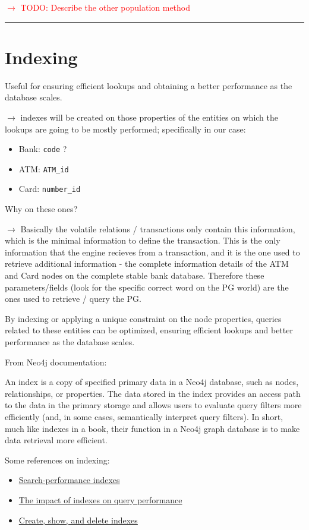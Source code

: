 \documentclass{article}
\begin{document}
\textcolor{red}{$\rightarrow$ TODO: Describe the other population method}

\textcolor{green}{\rule{\linewidth}{0.4mm}}


\section{Indexing}

Useful for ensuring efficient lookups and obtaining a better performance as the database 
scales.

$\rightarrow$ indexes will be created on those properties of the entities on which the 
lookups are going to be mostly performed; specifically in our case:
\begin{itemize}
  \item Bank: \texttt{code} ?
  \item ATM: \texttt{ATM\_id}
  \item Card: \texttt{number\_id}
\end{itemize}

Why on these ones?

$\rightarrow$ Basically the volatile relations / transactions only contain this information,
which is the minimal information to define the transaction. This is the only information that
the engine recieves from a transaction, and it is the one used to retrieve additional information - the complete information details of the ATM and Card nodes on the complete
stable bank database. Therefore these parameters/fields (look for the specific correct
word on the PG world) are the ones used to retrieve / query the PG. 

By indexing or applying a unique constraint on the node properties, queries related to these entities can be optimized, ensuring efficient lookups and better performance as the database scales.

From Neo4j documentation:
\begin{tcolorbox}
  An index is a copy of specified primary data in a Neo4j database, such as nodes, relationships, or properties. The data stored in the index provides an access path to the data in the primary storage and allows users to evaluate query filters more efficiently (and, in some cases, semantically interpret query filters). In short, much like indexes in a book, their function in a Neo4j graph database is to make data retrieval more efficient.
\end{tcolorbox}

Some references on indexing:
\begin{itemize}
  \item \href{https://neo4j.com/docs/cypher-manual/current/indexes/search-performance-indexes/overview/}{Search-performance indexes}
  \item \href{https://neo4j.com/docs/cypher-manual/current/indexes/search-performance-indexes/using-indexes/}{The impact of indexes on query performance}
  \item \href{https://neo4j.com/docs/cypher-manual/current/indexes/search-performance-indexes/managing-indexes/}{Create, show, and delete indexes}
\end{itemize}
\end{document}
